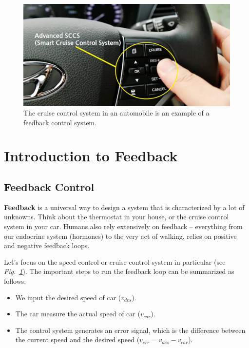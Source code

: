 \begin{figure}[t]
\centering
\includegraphics[width=.5\columnwidth]{image_0.png}
\caption{The cruise control system in an automobile is an example of a feedback control system.}
\label{fig:cruise_control}
\end{figure}
\section{Introduction to Feedback}
\subsection{Feedback Control}
\textbf{Feedback} is a universal way to design a system that is characterized by a lot of unknowns.  Think about the thermostat in your house, or the cruise control system in your car.  Humans also rely extensively on feedback -- everything from our endocrine system (hormones) to the very act of walking, relies on positive and negative feedback loops.  

Let's focus on the speed control or cruise control system in particular (see \emph{Fig.~\ref{fig:cruise_control}}).  The important steps to run the feedback loop can be summarized as follows:
    \begin{itemize}[topsep=8pt,itemsep=4pt,partopsep=4pt, parsep=4pt]
        \item{We input the desired speed of car ($v_{des}$).}
        \item{The car measure the actual speed of car ($v_{car}$).}
        \item{The control system generates an error signal, which is the difference between the current speed and the desired speed ($v_{err} = v_{des} - v_{car}$).}
    \end{itemize}

